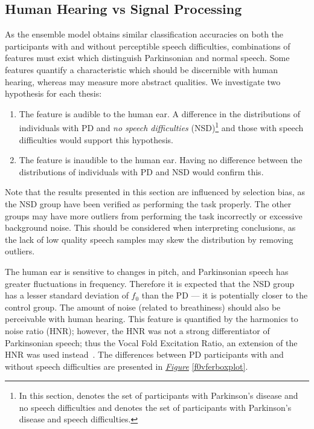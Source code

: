 \documentclass[12pt, twoside]{book}
\renewcommand\emph[1]{\textit{\color{USred}{#1}}}
\begin{document}
\subsection{Human Hearing vs Signal Processing}
\label{formalfeatures}
As the ensemble model obtains similar classification accuracies on both the participants with and without perceptible speech difficulties, combinations of features must exist which distinguish Parkinsonian and normal speech. Some features quantify a characteristic which should be discernible with human hearing, whereas may measure more abstract qualities. We investigate two hypothesis for each thesis: 
\begin{enumerate}
	\item The feature is audible to the human ear. A difference in the distributions of individuals with PD and \textit{no speech difficulties} (NSD)\footnote{In this section, \emph{NSD} denotes the set of participants with Parkinson's disease and no speech difficulties and \emph{PD} denotes the set of participants with Parkinson's disease and speech difficulties.} and those with speech difficulties would support this hypothesis.
	\item The feature is inaudible to the human ear. Having no difference between the distributions of individuals with PD and NSD would confirm this.
\end{enumerate}

Note that the results presented in this section are influenced by selection bias, as the NSD group have been verified as performing the task properly. The other groups may have more outliers from performing the task incorrectly or excessive background noise. This should be considered when interpreting conclusions, as the lack of low quality speech samples may skew the distribution by removing outliers.


The human ear is sensitive to changes in pitch, and Parkinsonian speech has greater fluctuations in frequency. Therefore it is expected that the NSD group has a lesser standard deviation of $f_0$ than the PD --- it is potentially closer to the control group. The amount of noise (related to breathiness) should also be perceivable with human hearing. This feature is quantified by the harmonics to noise ratio (HNR); however, the HNR was not a strong differentiator of Parkinsonian speech; thus the Vocal Fold Excitation Ratio, an extension of the HNR was used instead~\cite{tsanas2012novel}. The differences between PD participants with and without speech difficulties are presented in \textit{\hyperref[f0vferboxplot]{Figure}} \ref{f0vferboxplot}. 
\end{document}
